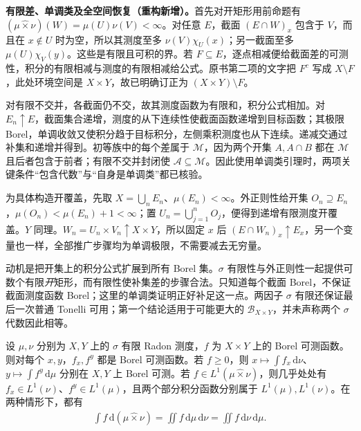 \documentclass[../../main.tex]{subfiles}
\begin{document}
\begin{remark}
\textbf{有限差、单调类及全空间恢复（重构新增）。}首先对开矩形用前命题有 $(\mu\mathbin{\widehat\times}\nu)(W)=\mu(U)\nu(V)<\infty$。对任意 $E$，截面 $(E\cap W)_x$ 包含于 $V$，而且在 $x\notin U$ 时为空，所以其测度至多 $\nu(V)\chi_U(x)$；另一截面至多 $\mu(U)\chi_V(y)$。这些是有限且可积的界。若 $F\subseteq E$，逐点相减便给截面差的可测性，积分的有限相减与测度的有限相减给公式。原书第二项的文字把 $F^c$ 写成 $X\setminus F$，此处环境空间是 $X\times Y$，故已明确订正为 $(X\times Y)\setminus F$。

对有限不交并，各截面仍不交，故其测度函数为有限和，积分公式相加。对 $E_n\uparrow E$，截面集合递增，测度的从下连续性使截面函数递增到目标函数；其极限 Borel，单调收敛又使积分趋于目标积分，左侧乘积测度也从下连续。递减交通过补集和递增并得到。初等族中的每个差属于 $\mathcal M$，因为两个开集 $A,A\cap B$ 都在 $\mathcal M$ 且后者包含于前者；有限不交并封闭使 $\mathcal A\subseteq\mathcal M$。因此使用单调类引理时，两项关键条件“包含代数”与“自身是单调类”都已核验。

为具体构造开覆盖，先取 $X=\bigcup_nE_n$、$\mu(E_n)<\infty$。外正则性给开集 $O_n\supseteq E_n$，$\mu(O_n)<\mu(E_n)+1<\infty$；置 $U_n=\bigcup_{j=1}^nO_j$，便得到递增有限测度开覆盖。$Y$ 同理。$W_n=U_n\times V_n\uparrow X\times Y$，所以固定 $x$ 后 $(E\cap W_n)_x\uparrow E_x$，另一个变量也一样，全部推广步骤均为单调极限，不需要减去无穷量。

动机是把开集上的积分公式扩展到所有 Borel 集。$\sigma$ 有限性与外正则性一起提供可数个有限\emph{开}矩形，而有限性使补集差的步骤合法。只知道每个截面 Borel，不保证截面测度函数 Borel；这里的单调类证明正好补足这一点。两因子 $\sigma$ 有限还保证最后一次普通 Tonelli 可用；第一个结论适用于可能更大的 $\mathscr B_{X\times Y}$，并未声称两个 $\sigma$ 代数因此相等。
\end{remark}
\begin{theorem}\label{theorem:ch07-radon-fubini-tonelli}
设 $\mu,\nu$ 分别为 $X,Y$ 上的 $\sigma$ 有限 Radon 测度，$f$ 为 $X\times Y$ 上的 Borel 可测函数。则对每个 $x,y$，$f_x,f^y$ 都是 Borel 可测函数。若 $f\geqslant0$，则 $x\mapsto\int f_x\,\mathrm d\nu$、$y\mapsto\int f^y\,\mathrm d\mu$ 分别在 $X,Y$ 上 Borel 可测。若 $f\in L^1(\mu\mathbin{\widehat\times}\nu)$，则几乎处处有 $f_x\in L^1(\nu)$、$f^y\in L^1(\mu)$，且两个部分积分函数分别属于 $L^1(\mu),L^1(\nu)$。在两种情形下，都有
\begin{align*}
\int f\,\mathrm d(\mu\mathbin{\widehat\times}\nu)
=\iint f\,\mathrm d\mu\,\mathrm d\nu
=\iint f\,\mathrm d\nu\,\mathrm d\mu.
\end{align*}
\end{theorem}
\end{document}
